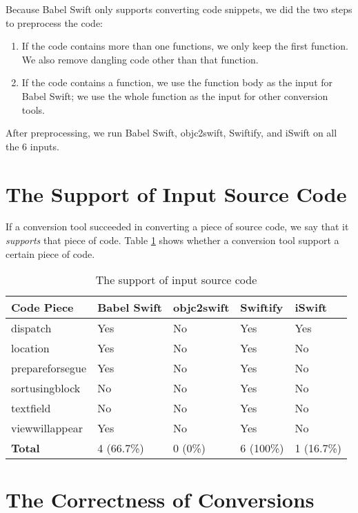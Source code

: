 \documentclass{sfuthesis}
\begin{document}
Because Babel Swift only supports converting code snippets, we did the two steps to preprocess the code:

\begin{enumerate}
  \item If the code contains more than one functions, we only keep the first function. We also remove dangling code other than that function.
  \item If the code contains a function, we use the function body as the input for Babel Swift; we use the whole function as the input for other conversion tools.
\end{enumerate}

After preprocessing, we run Babel Swift, objc2swift, Swiftify, and iSwift on all the 6 inputs.

\section{The Support of Input Source Code}

If a conversion tool succeeded in converting a piece of source code, we say that it \emph{supports} that piece of code. Table \ref{table:numcodesupported} shows whether a conversion tool support a certain piece of code.

\begin{table}[H]
\begin{center}
\begin{tabular}{|l|l|l|l|l|}
\hline
\textbf{Code Piece} & Babel Swift & objc2swift & Swiftify & iSwift \\
\hline
dispatch        & Yes & No  & Yes & Yes \\
location        & Yes & No  & Yes & No  \\
prepareforsegue & Yes & No  & Yes & No  \\
sortusingblock  & No  & No  & Yes & No  \\
textfield       & No  & No  & Yes & No  \\
viewwillappear  & Yes & No  & Yes & No  \\
\hline
\textbf{Total}  & 4 (66.7\%) & 0 (0\%) & 6 (100\%) & 1 (16.7\%) \\
\hline
\end{tabular}
\end{center}
\caption{The support of input source code}
\label{table:numcodesupported}
\end{table}

\section{The Correctness of Conversions}
\end{document}
